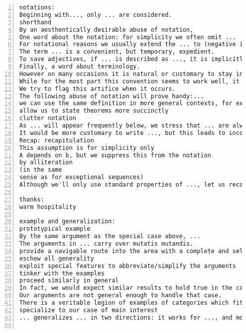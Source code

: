 \documentclass[11pt]{amsart}
\begin{document}
\begin{lstlisting}[numbers=left,numberstyle=\tiny,numbersep=10pt]
notations:
Beginning with..., only ... are considered.
shorthand
By an aesthentically desirable abuse of notation, 
One word about the notation: for simplicity we often omit ...
For notational reasons we usually extend the ... to (negative indices) by defining ...
The term ... is a convenient, but temporary, expedient.
To save adjectives, if ... is described as ..., it is implicitly assumed to be ...
Finally, a word about terminology.
However on many occasions it is natural or customary to stay in ... mode when nonetheless one has ... in mind.
While for the most part this convention seems to work well, it occasionally leads us to make extraneous ... hypotheses in order to invoke ...
We try to flag this artifice when it occurs.
The following abuse of notation will prove handy:...
we can use the same definition in more general contexts, for example, ...
allow us to state theorems more succinctly
clutter notation
As ... will appear frequently below, we stress that ... are always ... for us.
It would be more customary to write ..., but this leads to inconsistent notation.
Recap: recapitulation
This assumption is for simplicity only
A depends on b, but we suppress this from the notation
by alliteration
(in the same
sense as for exceptional sequences)
Although we'll only use standard properties of ..., let us recall a few definitions for the comfort of the reader.

thanks:
warm hospitality

example and generalization:
prototypical example
By the same argument as the special case above, ...
The arguments in ... carry over mutatis mutandis.
provide a navigable route into the area with a complete and self-contained account of the case ...
eschew all generality
exploit special features to abbreviate/simplify the arguments
tinker with the examples
proceed similarly in general
In fact, we would expect similar results to hold true in the case where ...
Our arguments are not general enough to handle that case.
There is a veritable legion of examples of categories which fit this paradigm:...
specialize to our case of main interest
... generalizes ... in two directions: it works for ..., and moreover it deals with ... instead of ...


\end{lstlisting}
\end{document}

